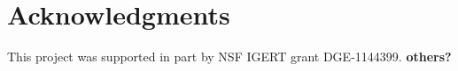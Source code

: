 \documentclass[10pt,letterpaper]{article}
\begin{document}




\section{Acknowledgments}
This project was supported in part by NSF IGERT grant DGE-1144399. \textbf{others?}


\setlength{\bibleftmargin}{.125in}
\setlength{\bibindent}{-\bibleftmargin}

\end{document}
